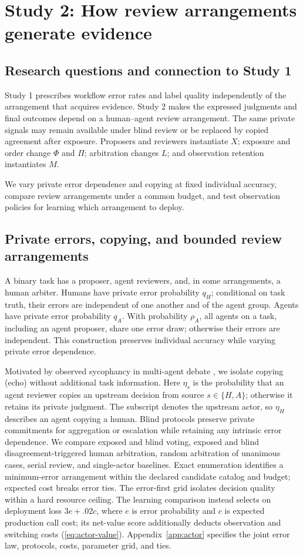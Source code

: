 \section{Study 2: How review arrangements generate evidence}
\label{sec:actor-review}
\subsection{Research questions and connection to Study 1}
Study 1 prescribes workflow error rates and label quality independently of the arrangement that acquires evidence. Study 2 makes the expressed judgments and final outcomes depend on a human--agent review arrangement. The same private signals may remain available under blind review or be replaced by copied agreement after exposure. Proposers and reviewers instantiate $X$; exposure and order change $\Phi$ and $\Pi$; arbitration changes $L$; and observation retention instantiates $M$.

We vary private error dependence and copying at fixed individual accuracy, compare review arrangements under a common budget, and test observation policies for learning which arrangement to deploy.

\subsection{Private errors, copying, and bounded review arrangements}
A binary task has a proposer, agent reviewers, and, in some arrangements, a human arbiter. Humans have private error probability $q_H$; conditional on task truth, their errors are independent of one another and of the agent group. Agents have private error probability $q_A$. With probability $\rho_A$, all agents on a task, including an agent proposer, share one error draw; otherwise their errors are independent. This construction preserves individual accuracy while varying private error dependence.

Motivated by observed sycophancy in multi-agent debate \citep{consensagent}, we isolate copying (echo) without additional task information. Here $\eta_s$ is the probability that an agent reviewer copies an upstream decision from source $s\in\{H,A\}$; otherwise it retains its private judgment. The subscript denotes the upstream actor, so $\eta_H$ describes an agent copying a human. Blind protocols preserve private commitments for aggregation or escalation while retaining any intrinsic error dependence. We compare exposed and blind voting, exposed and blind disagreement-triggered human arbitration, random arbitration of unanimous cases, serial review, and single-actor baselines. Exact enumeration identifies a minimum-error arrangement within the declared candidate catalog and budget; expected cost breaks error ties. The error-first grid isolates decision quality within a hard resource ceiling. The learning comparison instead selects on deployment loss $3e+.02c$, where $e$ is error probability and $c$ is expected production call cost; its net-value score additionally deducts observation and switching costs (\cref{eq:actor-value}). Appendix~\ref{app:actor} specifies the joint error law, protocols, costs, parameter grid, and ties.

